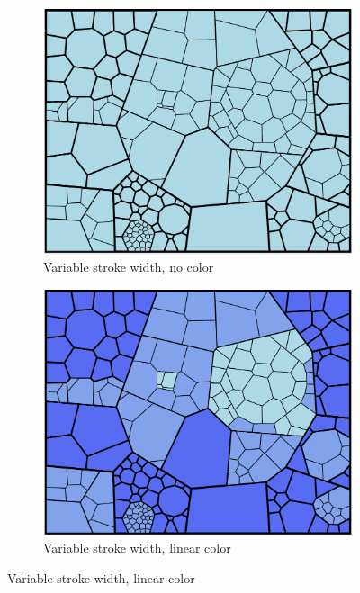 \documentclass{acm_proc_article-sp} \usepackage{cite}
\begin{document}
\begin{figure}
        \begin{subfigure}[b]{\comparelength}
                \includegraphics[width=\textwidth]{source-images/compare-stroke-none-cropped.PNG}
                \caption{Variable stroke width, no color}
        \end{subfigure}
        \qquad
        \begin{subfigure}[b]{\comparelength}
                \includegraphics[width=\textwidth]{source-images/compare-stroke-linear-cropped.PNG}
                \caption{Variable stroke width, linear color}
        \end{subfigure}
        \qquad

\end{figure}
\end{document}
